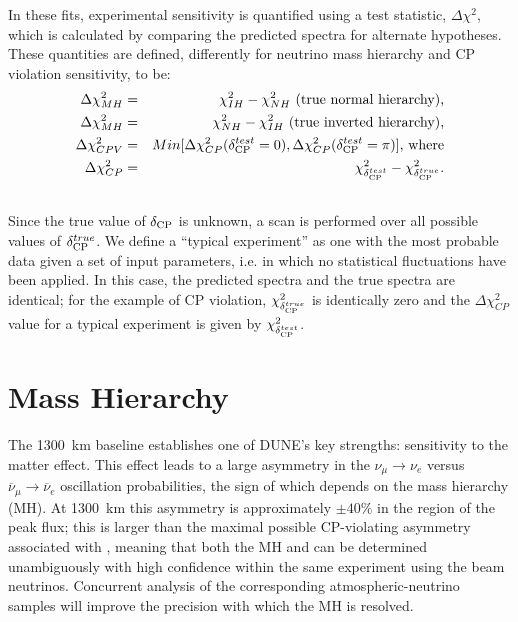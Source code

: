 In these fits, experimental sensitivity is
quantified using a test statistic, $\Delta\chi^2$, which is calculated
by comparing the predicted spectra for alternate hypotheses.
These quantities are defined, differently for neutrino mass hierarchy
and CP violation sensitivity, to be:
\begin{eqnarray}
\Delta\chi^2_{MH} & = & \chi^2_{IH} - \chi^2_{NH}\textrm{ (true normal hierarchy),}\label{eq:dx2_MH}\\ 
\Delta\chi^2_{MH} & = & \chi^2_{NH} - \chi^2_{IH}\textrm{ (true inverted hierarchy),}\\
\Delta\chi^2_{CPV} & = & Min[\Delta\chi^2_{CP}(\mdeltacp^{test}=0),\Delta\chi^2_{CP}(\mdeltacp^{test}=\pi)]\textrm{, where} \\
\Delta\chi^2_{CP} & = & \chi^2_{\mdeltacp^{test}} - \chi^2_{\mdeltacp^{true}}.\label{eq:dx2_CP} \\ \nonumber
\end{eqnarray}
Since the true value of $\mdeltacp$ is unknown, a scan is  performed over
all possible values of $\mdeltacp^{true}$. 
We define a ``typical experiment'' as one with the most probable data given a set of input parameters, 
i.e. in which no statistical fluctuations have been applied.
In this case, the predicted spectra and the true spectra are identical;
for the example of CP violation, $\chi^2_{\mdeltacp^{true}}$ 
is identically zero and the $\Delta\chi^2_{CP}$ value for a typical experiment is given by 
$\chi^2_{\mdeltacp^{test}}$.

\section{Mass Hierarchy}
\label{sec:physics-lbnosc-mh}

The 1300~km baseline establishes one of DUNE's key strengths: sensitivity to the matter
effect. This effect leads to a large asymmetry in the
$\nu_\mu\to \nu_e$ versus $\overline{\nu}_\mu \to \overline{\nu}_e$
oscillation probabilities, the sign of which depends on the mass
hierarchy (MH).  At 1300~km this asymmetry is approximately
$\pm 40\%$ in the region of the peak flux; this is larger than the
maximal possible CP-violating asymmetry associated with \deltacp,
meaning that both the MH and \deltacp can be
determined unambiguously with high confidence within the same
experiment using the beam neutrinos.  Concurrent analysis of the corresponding atmospheric-neutrino samples will improve the precision with which the
MH is resolved. 

